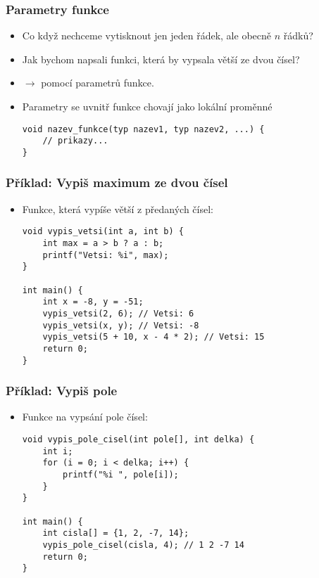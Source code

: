 \documentclass{beamer}
\newenvironment{itemizex}%
  {\large \begin{itemize}%
    \setlength{\itemsep}{8pt}%
    \setlength{\parskip}{8pt}}%
  {\end{itemize}}
\begin{document}
\begin{frame}[t,fragile]\frametitle{Parametry funkce} 
    \begin{itemizex}
        \item Co když nechceme vytisknout jen jeden řádek, ale obecně $n$ řádků?
        \item Jak bychom napsali funkci, která by vypsala větší ze dvou čísel? 
        \item $\longrightarrow$ pomocí parametrů funkce.
        \item Parametry se uvnitř funkce chovají jako lokální proměnné
        \begin{verbatim} 
void nazev_funkce(typ nazev1, typ nazev2, ...) { 
    // prikazy... 
}
        \end{verbatim}
    \end{itemizex}
\end{frame}



\begin{frame}[t,fragile]\frametitle{Příklad: Vypiš maximum ze dvou čísel} 
    \begin{itemizex}
        \item Funkce, která vypíše větší z předaných čísel:
        \begin{verbatim} 
void vypis_vetsi(int a, int b) {
    int max = a > b ? a : b;
    printf("Vetsi: %i", max);
}

int main() {
    int x = -8, y = -51;
    vypis_vetsi(2, 6); // Vetsi: 6
    vypis_vetsi(x, y); // Vetsi: -8
    vypis_vetsi(5 + 10, x - 4 * 2); // Vetsi: 15
    return 0;
}
        \end{verbatim}
    \end{itemizex}
\end{frame}


\begin{frame}[t,fragile]\frametitle{Příklad: Vypiš pole} 
    \begin{itemizex}
        \item Funkce na vypsání pole čísel:
        \begin{verbatim} 
void vypis_pole_cisel(int pole[], int delka) {
    int i;
    for (i = 0; i < delka; i++) {
        printf("%i ", pole[i]);
    }
}

int main() {
    int cisla[] = {1, 2, -7, 14};
    vypis_pole_cisel(cisla, 4); // 1 2 -7 14 
    return 0;
}
        \end{verbatim}
    \end{itemizex}
\end{frame}
\end{document}
